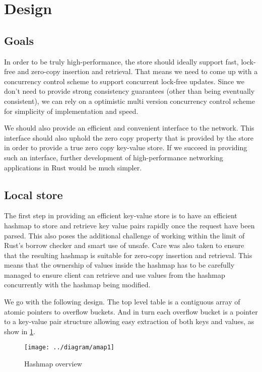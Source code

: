 \documentclass[11pt]{article}
\begin{document}
\section{Design}

\subsection{Goals}
In order to be truly high-performance, the store should ideally
support fast, lock-free and zero-copy insertion and retrieval. That
means we need to come up with a concurrency control scheme to support
concurrent lock-free updates. Since we don't need to provide strong
consistency guarantees (other than being eventually consistent), we
can rely on a optimistic multi version concurrency control scheme for
simplicity of implementation and speed.

We should also provide an efficient and convenient interface to the
network. This interface should also uphold the zero copy property that
is provided by the store in order to provide a true zero copy
key-value store. If we succeed in providing such an interface, further
development of high-performance networking applications in Rust would
be much simpler.

\subsection{Local store} \label{design-overview}
The first step in providing an efficient key-value store is to
have an efficient hashmap to store and retrieve key value pairs
rapidly once the request have been parsed. This also poses the
additional challenge of working within the limit of Rust's borrow
checker and smart use of unsafe. Care was also taken to ensure that
the resulting hashmap is suitable for zero-copy insertion and
retrieval. This means that the ownership of values inside the hashmap
has to be carefully managed to ensure client can retrieve and use
values from the hashmap concurrently with the hashmap being modified.

We go with the following design. The top level table is a contiguous
array of atomic pointers to overflow buckets. And in turn each
overflow bucket is a pointer to a key-value pair structure allowing
easy extraction of both keys and values, as show in \ref{fig:hashmap}.

\begin{figure}[h!]
  \texttt{[image: ../diagram/amap1]}
  \caption{Hashmap overview}
  \label{fig:hashmap}
\end{figure}
\end{document}
